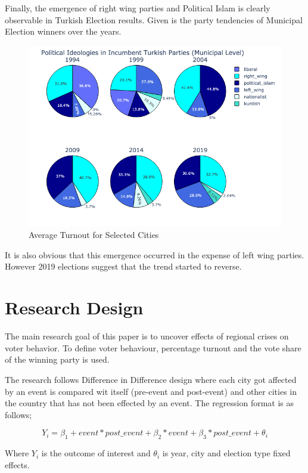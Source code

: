 \documentclass[12pt]{article}
\begin{document}
Finally, the emergence of right wing parties and Political Islam is clearly observable in Turkish Election results. Given is the party tendencies of Municipal Election winners over the years. 

\begin{figure}[h]
 \centering
\includegraphics[width=15cm]{paper/ideologies.png}
 \caption{Average Turnout for Selected Cities}
\end{figure}
\newpage

It is also obvious that this emergence occurred in the expense of left wing parties. However 2019 elections suggest that the trend started to reverse.

\section{Research Design}

The main research goal of this paper is to uncover effects of regional crises on voter behavior. To define voter behaviour, percentage turnout and the vote share of the winning party is used. 

The research follows Difference in Difference design where each city got affected by an event is compared wit itself (pre-event and post-event) and other cities in the country that has not been effected by an event. The regression format is as follows;

$$ Y_i = \beta_{1} + {event * post\_event} + \beta_{2} * {event} + \beta_{3} * {post\_event} + \theta_i$$

Where $Y_i$ is the outcome of interest and $\theta_i$ is year, city and election type fixed effects.
\end{document}
